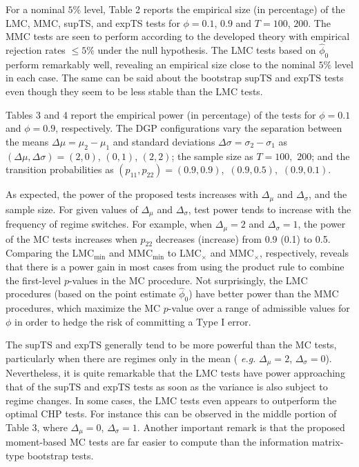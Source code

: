 \documentclass[11pt]{article}
\begin{document}
For a nominal $5\%$ level, Table 2 reports the empirical size (in
percentage) of the LMC, MMC, supTS, and expTS tests for $\phi=0.1$, $0.9$
and $T=100$, $200.$ The MMC tests are seen to perform according to the
developed theory with empirical rejection rates $\le 5\%$ under the null
hypothesis. The LMC tests based on $\hat \phi_0$ perform remarkably well,
revealing an empirical size close to the nominal $5\%$ level in each case.
The same can be said about the bootstrap $\mbox{supTS}$ and $\mbox{expTS}$
tests even though they seem to be less stable than the LMC tests.

Tables 3 and 4 report the empirical power (in percentage) of the tests for $%
\phi =0.1$ and $\phi =0.9$, respectively. The DGP configurations vary the
separation between the means $\Delta \mu =\mu _{2}-\mu _{1}$ and standard
deviations $\Delta \sigma =\sigma _{2}-\sigma _{1}$ as $(\Delta \mu ,\Delta
\sigma )=(2,0)$, $(0,1)$, $(2,2)$; the sample size as $T=100,$ $200$; and
the transition probabilities as $(p_{11},p_{22})=(0.9,0.9),$ $(0.9,0.5),$ $%
(0.9,0.1)$.

As expected, the power of the proposed tests increases with $\Delta _{\mu }$
and $\Delta _{\sigma }$, and the sample size. For given values of $\Delta
_{\mu }$ and $\Delta _{\sigma }$, test power tends to increase with the
frequency of regime switches. For example, when $\Delta _{\mu }=2$ and $%
\Delta _{\sigma }=1$, the power of the MC tests increases when $p_{22}$
decreases (increase) from 0.9 (0.1) to 0.5. Comparing the LMC$_{\min }$ and
MMC$_{\min }$ to LMC$_{\times }$ and MMC$_{\times }$, respectively, reveals
that there is a power gain in most cases from using the product rule to
combine the first-level $p$-values in the MC procedure. Not surprisingly,
the LMC procedures (based on the point estimate $\hat{\phi}_{0}$) have
better power than the MMC procedures, which maximize the MC $p$-value over a
range of admissible values for $\phi $ in order to hedge the risk of
committing a Type I error.

The $\mbox{supTS}$ and $\mbox{expTS}$ generally tend to be more powerful
than the MC tests, particularly when there are regimes only in the mean (%
\emph{e.g.} $\Delta _{\mu }=2$, $\Delta _{\sigma}=0 $). Nevertheless, it is
quite remarkable that the LMC tests have power approaching that of the $%
\mbox{supTS}$ and $\mbox{expTS}$ tests as soon as the variance is also
subject to regime changes. In some cases, the LMC tests even appears to
outperform the optimal CHP tests. For instance this can be observed in the
middle portion of Table 3, where $\Delta _{\mu }=0$, $\Delta _{\sigma}=1 $.
Another important remark is that the proposed moment-based MC tests are far
easier to compute than the information matrix-type bootstrap tests.
\end{document}
